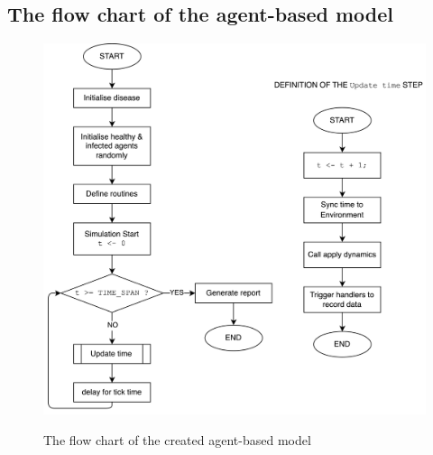 \documentclass[12pt]{article}
\begin{document}
\begin{appendices}
    \newpage

	\subsection{The flow chart of the agent-based model}
	\begin{figure}[ht]
		\centering
		\includegraphics[width=\linewidth]{./assets/model-flow-chart.png}
        \label{fig:model-flow-chart} 
		\caption{\scriptsize \sffamily The flow chart of the created agent-based model}
	\end{figure}
\end{appendices}
\end{document}
